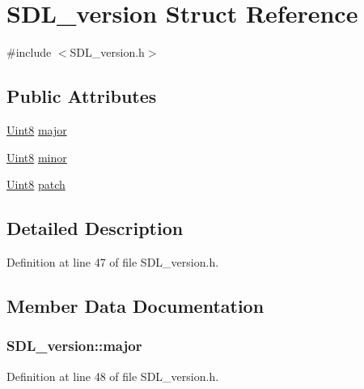 \hypertarget{struct_s_d_l__version}{}\section{S\+D\+L\+\_\+version Struct Reference}
\label{struct_s_d_l__version}


{\ttfamily \#include $<$S\+D\+L\+\_\+version.\+h$>$}

\subsection*{Public Attributes}
\begin{DoxyCompactItemize}
\item 
\hyperlink{_s_d_l__stdinc_8h_a2944638813a090aa23e62f4da842c3e2}{Uint8} \hyperlink{struct_s_d_l__version_ad7d7674532073eed237b90f546c97cd0}{major}
\item 
\hyperlink{_s_d_l__stdinc_8h_a2944638813a090aa23e62f4da842c3e2}{Uint8} \hyperlink{struct_s_d_l__version_a6c35c7bf80245028d5970e6a504ecf57}{minor}
\item 
\hyperlink{_s_d_l__stdinc_8h_a2944638813a090aa23e62f4da842c3e2}{Uint8} \hyperlink{struct_s_d_l__version_aa6dacff18edee8cd037c773b843be0f1}{patch}
\end{DoxyCompactItemize}


\subsection{Detailed Description}


Definition at line 47 of file S\+D\+L\+\_\+version.\+h.



\subsection{Member Data Documentation}
\hypertarget{struct_s_d_l__version_ad7d7674532073eed237b90f546c97cd0}{}
\subsubsection[{major}]{ S\+D\+L\+\_\+version\+::major}\label{struct_s_d_l__version_ad7d7674532073eed237b90f546c97cd0}


Definition at line 48 of file S\+D\+L\+\_\+version.\+h.

